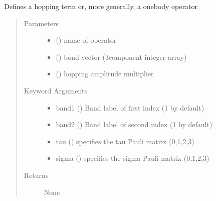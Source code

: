 \documentclass[letterpaper,10pt,english]{sphinxmanual}
\begin{document}
\begin{fulllineitems}
\label{\detokenize{functions:pyqcm.hopping_operator}}
\sphinxAtStartPar
Defines a hopping term or, more generally, a one\sphinxhyphen{}body operator
\begin{quote}\begin{description}
\item[{Parameters}] \leavevmode\begin{itemize}
\item {} 
\sphinxAtStartPar
{} () \textendash{} name of operator

\item {} 
\sphinxAtStartPar
{} (\sphinxstyleliteralemphasis{\sphinxupquote{{[}}}\sphinxstyleliteralemphasis{\sphinxupquote{{]}}}) \textendash{} bond vector (3\sphinxhyphen{}component integer array)

\item {} 
\sphinxAtStartPar
{} () \textendash{} hopping amplitude multiplier

\end{itemize}

\item[{Keyword Arguments}] \leavevmode\begin{itemize}
\item {} 
\sphinxAtStartPar
band1 () \textendash{} Band label of first index (1 by default)

\item {} 
\sphinxAtStartPar
band2 () \textendash{} Band label of second index (1 by default)

\item {} 
\sphinxAtStartPar
tau () \textendash{} specifies the tau Pauli matrix  (0,1,2,3)

\item {} 
\sphinxAtStartPar
sigma () \textendash{} specifies the sigma Pauli matrix  (0,1,2,3)

\end{itemize}

\item[{Returns}] \leavevmode
\sphinxAtStartPar
None

\end{description}\end{quote}

\end{fulllineitems}
\end{document}

